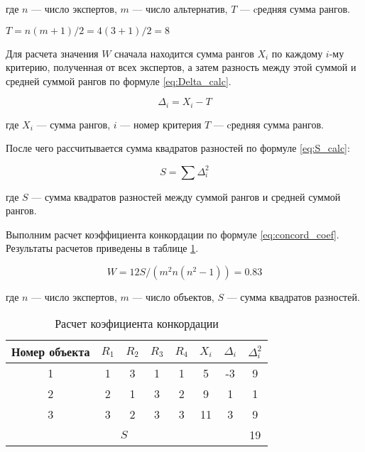 \noindent
где $n$ --- число экспертов,
$m$ --- число альтернатив, 
$T$ --- cредняя сумма рангов.

\begin{center}
    $T=n(m+1)/2 = 4(3+1)/2=8$
\end{center}

Для расчета значения $W$ сначала находится сумма рангов $X_i$ по каждому $i$-му критерию, полученная от всех экспертов, 
а затем разность между этой суммой и средней суммой рангов по формуле \ref{eq:Delta_calc}.

\begin{equation}
    \label{eq:Delta_calc}
    \Delta_i=X_i-T
\end{equation}

\noindent
где $X_i$ --- сумма рангов,
$i$ --- номер критерия 
$T$ --- cредняя сумма рангов.

После чего рассчитывается сумма квадратов разностей по формуле \ref{eq:S_calc}:

\begin{equation}
    \label{eq:S_calc}
    S=\sum{\Delta^2_i}
\end{equation}

\noindent
где $S$ --- сумма квадратов разностей между суммой рангов и средней суммой рангов.

Выполним расчет коэффициента конкордации по формуле \ref{eq:concord_coef}.
Результаты расчетов приведены в таблице \ref{table:experts_concord}.

\begin{equation}
    \label{eq:concord_coef}
    W = 12S/(m^2 n (n^2-1)) = 0.83
\end{equation}

\noindent
где $n$ --- число экспертов,
$m$ --- число объектов,
$S$ --- сумма квадратов разностей.

\begin{table}[H]
    \centering
    \caption{Расчет коэфициента конкордации}\label{table:experts_concord}
    \begin{tabular}{|c|c|c|c|c|c|c|c|}
    \hline Номер объекта & $R_1$ & $R_2$ & $R_3$ & $R_4$ & $X_i$ & $\Delta_i$ & $\Delta^2_i$ \\
    \hline 1 & 1 & 3 & 1 & 1  & 5 & -3 & 9 \\
    \hline 2 & 2 & 1 & 3 &  2 & 9 & 1 & 1 \\
    \hline 3 & 3 & 2 & 3 & 3 & 11 & 3 & 9 \\
    \hline \multicolumn{7}{|c|}{$S$} & 19 \\
    \hline
    \end{tabular}
\end{table}

